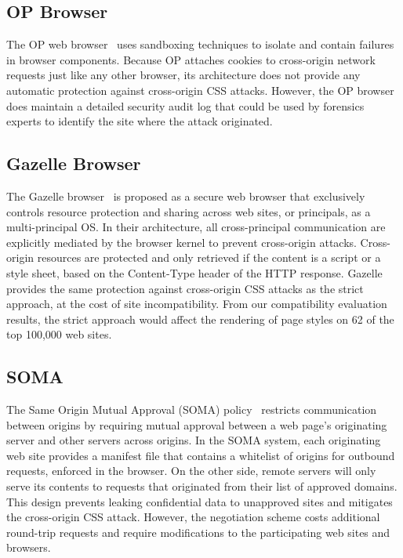 \documentclass{acm_proc_article-sp}
\begin{document}
\subsection{OP Browser}
The OP web browser~\cite{op-browser} uses sandboxing techniques to isolate and
contain failures in browser components. Because OP attaches cookies to
cross-origin network requests just like any other browser, its architecture
does not provide any automatic protection against cross-origin CSS attacks.
However, the OP browser does maintain a detailed security audit log that could
be used by forensics experts to identify the site where the attack originated.

\subsection{Gazelle Browser}
The Gazelle browser~\cite{gazelle} is proposed as a secure web browser that exclusively controls resource protection and sharing across web sites, or principals, as a multi-principal OS. In their architecture, all cross-principal communication are explicitly mediated by the browser kernel to prevent cross-origin attacks. Cross-origin resources are protected and only retrieved if the content is a script or a style sheet, based on the Content-Type header of the HTTP response. Gazelle provides the same protection against cross-origin CSS attacks as the strict approach, at the cost of site incompatibility. From our compatibility evaluation results, the strict approach would affect the rendering of page styles on 62 of the top 100,000 web sites.

\subsection{SOMA}
The Same Origin Mutual Approval (SOMA) policy~\cite{soma} restricts communication between origins by requiring mutual approval between a web page's originating server and other servers across origins. In the SOMA system, each originating web site provides a manifest file that contains a whitelist of origins for outbound requests, enforced in the browser. On the other side, remote servers will only serve its contents to requests that originated from their list of approved domains. This design prevents leaking confidential data to unapproved sites and mitigates the cross-origin CSS attack. However, the negotiation scheme costs additional round-trip requests and require modifications to the participating web sites and browsers.
\end{document}
